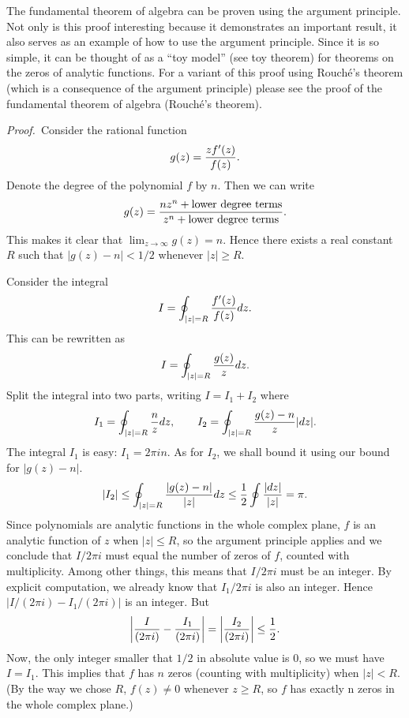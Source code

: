 \documentclass[12pt]{article}
\begin{document}
The fundamental theorem of algebra can be proven using the argument principle.  Not only is this proof interesting because it demonstrates an important result, it also serves as an example of how to use the argument principle.  Since it is so simple, it can be thought of as a ``toy model'' (see toy theorem) for theorems on the zeros of analytic functions.  For a variant of this proof using Rouch\'e's theorem (which is a consequence of the argument principle) please see the proof of the fundamental theorem of algebra (Rouch\'e's theorem).

\emph{Proof.}\, Consider the rational function
 $$g(z) = {z f'(z) \over f(z)}.$$
Denote the degree of the polynomial $f$ by $n$.  Then we can write
 $$g(z) = {n z^n + \hbox{lower degree terms} \over z^n + \hbox{lower degree terms}}.$$
This makes it clear that $\lim_{z \to \infty} g(z) = n$.  Hence there exists a real constant $R$ such that $|g(z) - n| < 1/2$ whenever $|z| \ge R$.

Consider the integral
 $$I = \oint_{|z| = R} {f'(z) \over f(z)} dz.$$
This can be rewritten as
 $$I = \oint_{|z| = R} {g(z) \over z} dz.$$
Split the integral into two parts, writing $I = I_1 + I_2$ where
 $$I_1 = \oint_{|z| = R} {n \over z} dz, \qquad I_2 = \oint_{|z| = R} {g(z) - n \over z} |dz|.$$
The integral $I_1$ is easy: $I_1 = 2 \pi i n$.  As for $I_2$, we shall bound it using our bound for $|g(z) - n|$.
 $$|I_2| \le \oint_{|z| = R} {|g(z) - n| \over |z|} dz \le {1 \over 2} \oint {|dz| \over |z|} = \pi.$$
Since polynomials are analytic functions in the whole complex plane, $f$ is an analytic function of $z$ when $|z| \le R$, so the argument principle applies and we conclude that $I / 2 \pi i$ must equal the number of zeros of $f$, counted with multiplicity.  Among other things, this means that $I / 2 \pi i$ must be an integer.  By explicit computation, we already know that $I_1 / 2\pi i$ is also an integer.  Hence $|I / (2 \pi i) - I_1 /  (2 \pi i)|$ is an integer.  But 
 $$\left| {I \over (2 \pi i)} - {I_1 \over  (2 \pi i)} \right| = \left| {I_2 \over (2 \pi i)} \right| \le {1 \over 2}.$$
Now, the only integer smaller that $1/2$ in absolute value is $0$, so we must have $I = I_1$.  This implies that $f$ has $n$ zeros (counting with multiplicity) when $|z| < R$.  (By the way we chose $R$, $f(z) \ne 0$ whenever $z \ge R$, so $f$ has exactly n zeros in the whole complex plane.)
\end{document}
